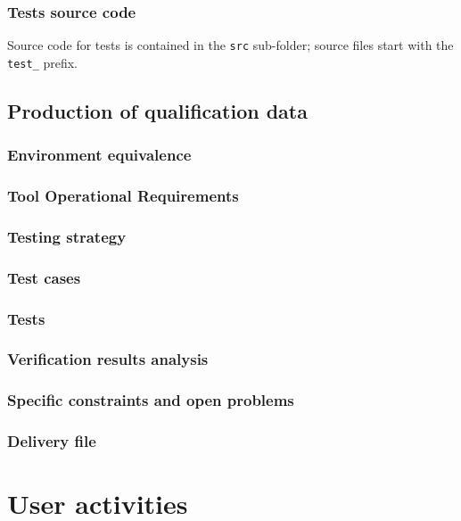 \documentclass {report}
\begin{document}
\subsection{Tests source code}
Source code for tests is contained in the \texttt{src} sub-folder; source files start with the \texttt{test\_} prefix. 

\section{Production of qualification data}
\subsection{Environment equivalence}
\subsection{Tool Operational Requirements}
\subsection{Testing strategy}
\subsection{Test cases}
\subsection{Tests}
\subsection{Verification results analysis}
\subsection{Specific constraints and open problems}
\label{sec:constr-problems}
\subsection{Delivery file}
\label{sec:delivery}

\chapter{User activities}
\label{sec:user-act}
\end{document}
